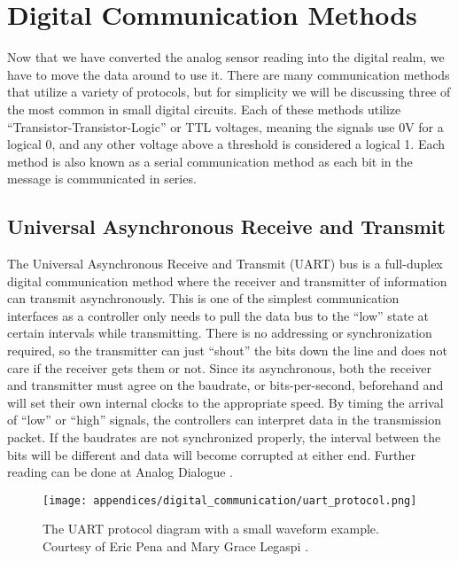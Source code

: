 \chapter{Digital Communication Methods} 
Now that we have converted the analog sensor reading into the digital realm, we have to move the data around to use it.
There are many communication methods that utilize a variety of protocols, but for simplicity we will be discussing three of the most common in small digital circuits.
Each of these methods utilize ``Transistor-Transistor-Logic'' or TTL voltages, meaning the signals use 0V for a logical 0, and any other voltage above a threshold is considered a logical 1.
Each method is also known as a serial communication method as each bit in the message is communicated in series.

\section[UART Explained]{Universal Asynchronous Receive and Transmit} 
The Universal Asynchronous Receive and Transmit (UART) bus is a full-duplex digital communication method where the receiver and transmitter of information can transmit asynchronously. 
This is one of the simplest communication interfaces as a controller only needs to pull the data bus to the ``low'' state at certain intervals while transmitting.
There is no addressing or synchronization required, so the transmitter can just ``shout'' the bits down the line and does not care if the receiver gets them or not.
Since its asynchronous, both the receiver and transmitter must agree on the baudrate, or bits-per-second, beforehand and will set their own internal clocks to the appropriate speed.
By timing the arrival of ``low'' or ``high'' signals, the controllers can interpret data in the transmission packet.
If the baudrates are not synchronized properly, the interval between the bits will be different and data will become corrupted at either end.
Further reading can be done at Analog Dialogue \cite{AnalogDialogue:UART}.

\begin{figure}[h!]
    \caption[UART protocol diagram]{The UART protocol diagram with a small waveform example. 
    Courtesy of Eric Pena and Mary Grace Legaspi \cite{AnalogDialogue:UART}.}
    \centering
    \texttt{[image: appendices/digital\_communication/uart\_protocol.png]}
\end{figure}

